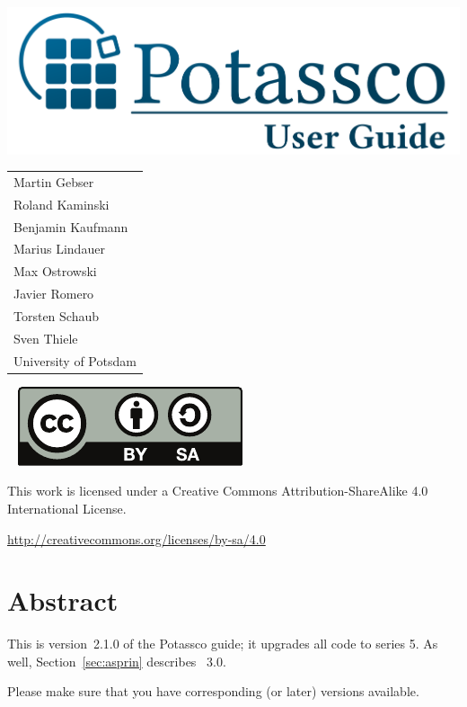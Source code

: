 \thispagestyle{empty}
\bigskip
\noindent
\includegraphics[width=\textwidth]{potassco_logo_blue}
\bigskip

\vfill

\hspace{5pt}
{\Large\color{potcolor}
\begin{tabular}{l}
Martin Gebser \\
Roland Kaminski \\
Benjamin Kaufmann \\
Marius Lindauer \\
Max Ostrowski \\
Javier Romero \\
Torsten Schaub \\
Sven Thiele \\[30pt]
University of Potsdam
\end{tabular}}

\newpage
\thispagestyle{empty}\ 
\vfill
\noindent
\includegraphics{by-sa}

\bigskip

\noindent
This work is licensed under a Creative Commons Attribution-ShareAlike 4.0\\ International License.

\medskip

\noindent
\url{http://creativecommons.org/licenses/by-sa/4.0}
\newpage
\thispagestyle{empty}\ 
\section*{Abstract}


\bigskip
\noindent
This is version~2.1.0 of the Potassco guide;
it upgrades all code to \clingo{} series 5.
As well, Section~\ref{sec:asprin} describes \asprin~3.0.

\medskip
\noindent
Please make sure that you have corresponding (or later) versions available.

